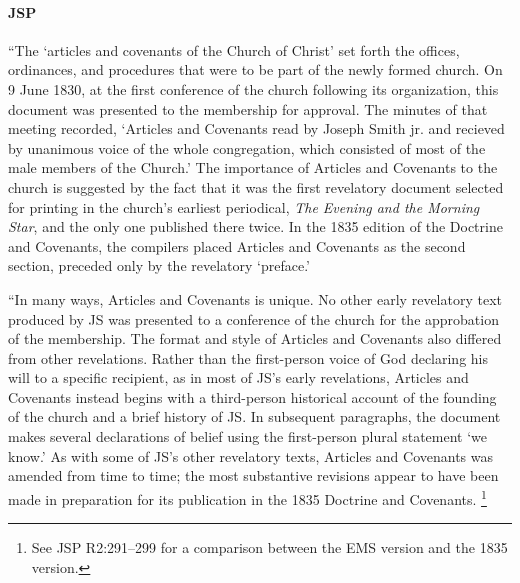 		\paragraph{JSP}
		
			``The `articles and covenants of the Church of Christ' set forth the offices, ordinances, and procedures that were to be part of the newly formed church. On 9 June 1830, at the first conference of the church following its organization, this document was presented to the membership for approval. The minutes of that meeting recorded, `Articles and Covenants read by Joseph Smith jr. and recieved by unanimous voice of the whole congregation, which consisted of most of the male members of the Church.' The importance of Articles and Covenants to the church is suggested by the fact that it was the first revelatory document selected for printing in the church's earliest periodical, \textit{The Evening and the Morning Star}, and the only one published there twice. In the 1835 edition of the Doctrine and Covenants, the compilers placed Articles and Covenants as the second section, preceded only by the revelatory `preface.'

			``In many ways, Articles and Covenants is unique. No other early revelatory text produced by JS was presented to a conference of the church for the approbation of the membership. The format and style of Articles and Covenants also differed from other revelations. Rather than the first-person voice of God declaring his will to a specific recipient, as in most of JS's early revelations, Articles and Covenants instead begins with a third-person historical account of the founding of the church and a brief history of JS. In subsequent paragraphs, the document makes several declarations of belief using the first-person plural statement `we know.' As with some of JS's other revelatory texts, Articles and Covenants was amended from time to time; the most substantive revisions appear to have been made in preparation for its publication in the 1835 Doctrine and Covenants.%
				\footnote{%
					See JSP R2:291--299 for a comparison between the EMS version and the 1835 version.
					}

